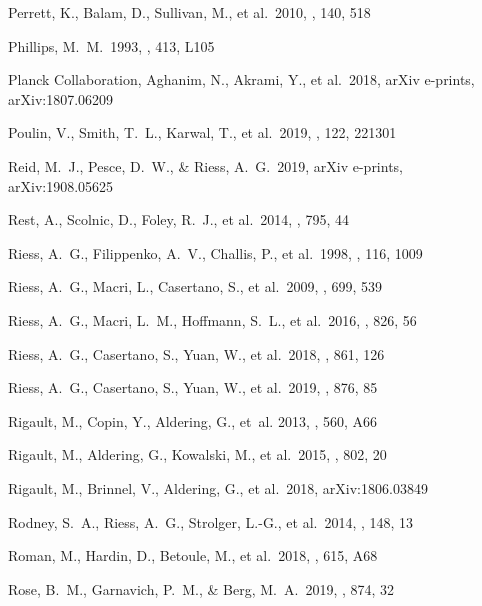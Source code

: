 \documentclass[]{aa}
\begin{document}
\begin{thebibliography}{}
 Perrett, K., Balam, D., Sullivan,
M., et al.\ 2010, \aj, 140, 518

 Phillips, M.~M.\ 1993, \apjl, 413, L105

 Planck Collaboration,
Aghanim, N., Akrami, Y., et al.\ 2018, arXiv e-prints, arXiv:1807.06209

 Poulin, V., Smith, T.~L., Karwal, T.,
et al.\ 2019, \prl, 122, 221301


 Reid, M.~J., Pesce, D.~W., \& Riess,
A.~G.\ 2019, arXiv e-prints, arXiv:1908.05625

 Rest, A., Scolnic, D., Foley, R.~J., et
al.\ 2014, \apj, 795, 44

 Riess, A.~G., Filippenko, A.~V.,
Challis, P., et al.\ 1998, \aj, 116, 1009

 Riess, A.~G., Macri, L., Casertano, S.,
et al.\ 2009, \apj, 699, 539

 Riess, A.~G., Macri, L.~M., Hoffmann,
S.~L., et al.\ 2016, \apj, 826, 56

 Riess, A.~G., Casertano, S., Yuan, W.,
et al.\ 2018, \apj, 861, 126

 Riess, A.~G., Casertano, S., Yuan, W.,
et al.\ 2019, \apj, 876, 85

 Rigault, M., Copin, Y.,
Aldering, G., {et~al.} 2013, \aap, 560, A66

 Rigault, M., Aldering, G., Kowalski,
M., et al.\ 2015, \apj, 802, 20

 Rigault, M., Brinnel, V., Aldering,
G., et al.\ 2018, arXiv:1806.03849

 Rodney, S.~A., Riess, A.~G., Strolger,
L.-G., et al.\ 2014, \aj, 148, 13 
  
 Roman, M., Hardin, D., Betoule, M., et
al.\ 2018, \aap, 615, A68

 Rose, B.~M., Garnavich, P.~M., \& Berg,
M.~A.\ 2019, \apj, 874, 32


\end{thebibliography}
\end{document}
